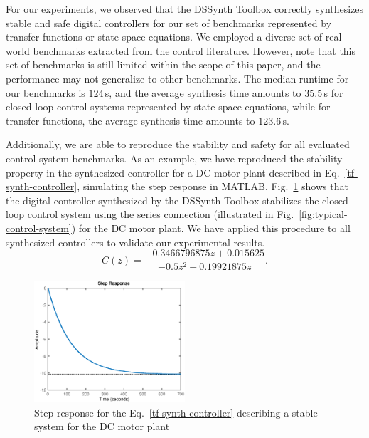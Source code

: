 \documentclass[conference]{IEEEtran}
\newcommand\tool{{DSSynth Toolbox}\xspace}
\begin{document}

For our experiments, we observed that the \tool correctly synthesizes stable
and safe digital controllers for our set of benchmarks represented by
transfer functions or state-space equations.  We employed a diverse set of
real-world benchmarks extracted from the control literature.  However, note
that this set of benchmarks is still limited within the scope of this paper,
and the performance may not generalize to other benchmarks.  The median
runtime for our benchmarks is $124$\,s, and the average synthesis time
amounts to $35.5$\,s for closed-loop control systems represented by
state-space equations, while for transfer functions, the average synthesis
time amounts to $123.6$\,s.

Additionally, we are able to reproduce the stability and safety for all
evaluated control system benchmarks.  As an example, we have reproduced the
stability property in the synthesized controller for a DC motor plant
described in Eq.~\eqref{tf-synth-controller}, simulating the step response
in MATLAB.  Fig.~\ref{tf-step-response} shows that the digital controller
synthesized by the \tool stabilizes the closed-loop control system using the
series connection (illustrated in Fig.~\ref{fig:typical-control-system}) for
the DC motor plant.  We have applied this procedure to all synthesized
controllers to validate our experimental results.
%
\begin{equation}
\label{tf-synth-controller}
C(z)=\frac{-0.3466796875z+0.015625}{-0.5z^{2}+0.19921875z}.
\end{equation}

\begin{figure}[ht]
  \includegraphics[width=0.5\textwidth]{tf-step-response.eps}
  \caption{Step response for the Eq.~\eqref{tf-synth-controller} describing a stable system for the DC motor plant}
  \label{tf-step-response}
\end{figure}
\end{document}
